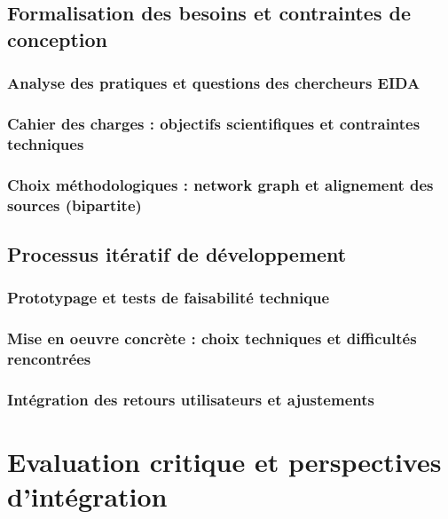 \documentclass[a4paper,12pt,twoside]{book}
\newcommand{\clearemptydoublepage}{\newpage{\pagestyle{empty}\cleardoublepage}}
\begin{document}
	\chapter{Formalisation des besoins et contraintes de conception}
	\section{Analyse des pratiques et questions des chercheurs EIDA}
	
	
	\section{Cahier des charges : objectifs scientifiques et contraintes techniques}
	
	
	\section{Choix méthodologiques : network graph et alignement des sources (bipartite)}
	
	
	\clearemptydoublepage
	
	\chapter{Processus itératif de développement}
	\section{Prototypage et tests de faisabilité technique}
	
	
	\section{Mise en oeuvre concrète : choix techniques et difficultés rencontrées}
	
	
	\section{Intégration des retours utilisateurs et ajustements}
	
	
	\clearemptydoublepage
	
	\part{Evaluation critique et perspectives d'intégration}
\end{document}
